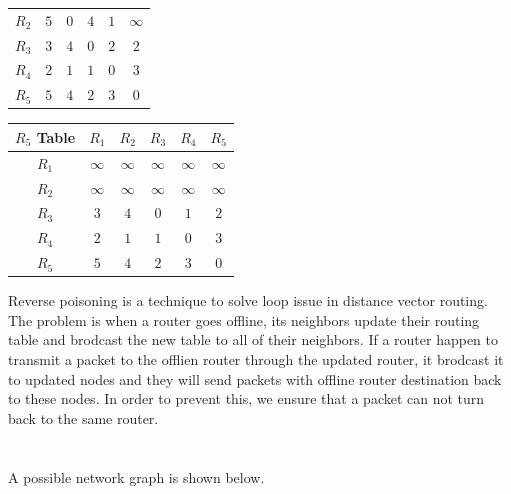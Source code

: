 \documentclass[en]{university}
\begin{document}
\begin{table}[H]
\begin{tabular}{c|*5c}
        $R_2$       & $5$   & $0$   & $4$      & $1$   & $\infty$ \\
        $R_3$       & $3$   & $4$   & $0$      & $2$   & $2$      \\
        $R_4$       & $2$   & $1$   & $1$      & $0$   & $3$      \\
        $R_5$       & $5$   & $4$   & $2$      & $3$   & $0$
    \end{tabular}
    \begin{tabular}{c|*5c}
        $R_5$ Table & $R_1$    & $R_2$    & $R_3$    & $R_4$    & $R_5$    \\
        \hline
        $R_1$       & $\infty$ & $\infty$ & $\infty$ & $\infty$ & $\infty$ \\
        $R_2$       & $\infty$ & $\infty$ & $\infty$ & $\infty$ & $\infty$ \\
        $R_3$       & $3$      & $4$      & $0$      & $1$      & $2$      \\
        $R_4$       & $2$      & $1$      & $1$      & $0$      & $3$      \\
        $R_5$       & $5$      & $4$      & $2$      & $3$      & $0$
    \end{tabular}
\end{table}

Reverse poisoning is a technique to solve loop issue in distance vector routing. The problem is when a router goes offline, its neighbors update their routing table and brodcast the new table to all of their neighbors. If a router happen to transmit a packet to the offlien router through the updated router, it brodcast it to updated nodes and they will send packets with offline router destination back to these nodes. In order to prevent this, we ensure that a packet can not turn back to the same router.

\section{}
A possible network graph is shown below.

\begin {center}
\end{center}
\end{document}
